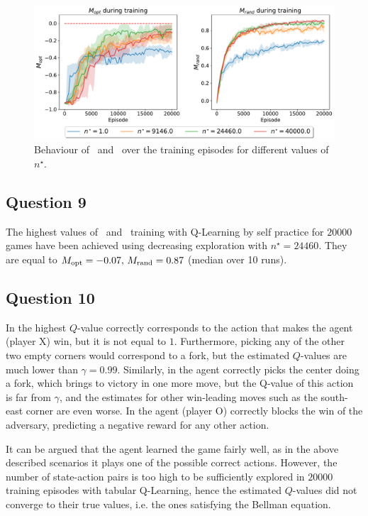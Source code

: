 \documentclass[10pt]{IEEEtran}
\begin{document}
\begin{figure}[h]
    \centering
    \includegraphics[width=\linewidth]{code/figures/performance_n_star_self.pdf}
    \caption{Behaviour of \mopt\ and \mrand\ over the training episodes for different values of $n^{\star}$.}
    \label{plot_question8}
\end{figure}

\subsection*{Question 9}
The highest values of \mopt\  and \mrand\  training with Q-Learning by self practice for $20000$ games have been achieved using decreasing exploration with $n^{\star} = 24460$. They are equal to $M_{\text{opt}} = -0.07, \, M_{\text{rand}} = 0.87$ (median over 10 runs).

\subsection*{Question 10}
In  the highest $Q$-value correctly corresponds to the action that makes the agent (player X) win, but it is not equal to $1$. Furthermore, picking any of the other two empty corners would correspond to a fork, but the estimated $Q$-values are much lower than $\gamma = 0.99$. Similarly, in  the agent correctly picks the center doing a fork, which brings to victory in one more move, but the Q-value of this action is far from $\gamma$, and the estimates for other win-leading moves such as the south-east corner are even worse. In  the agent (player O) correctly blocks the win of the adversary, predicting a negative reward for any other action.

It can be argued that the agent learned the game fairly well, as in the above described scenarios it plays one of the possible correct actions. However, the number of state-action pairs is too high to be sufficiently explored in $20000$ training episodes with tabular Q-Learning, hence the estimated $Q$-values did not converge to their true values, i.e. the ones satisfying the Bellman equation. 
\end{document}
